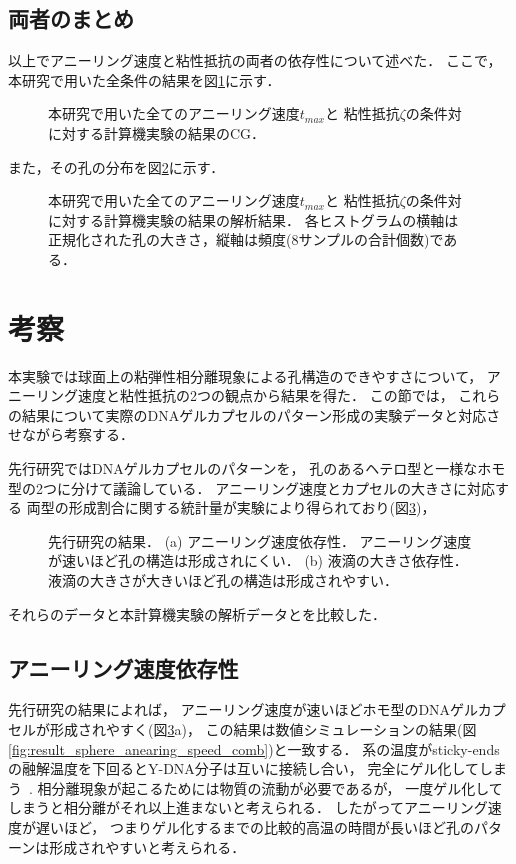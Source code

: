 \subsection{両者のまとめ}
以上でアニーリング速度と粘性抵抗の両者の依存性について述べた．
ここで，本研究で用いた全条件の結果を図\ref{fig:result_sphere_all}に示す．
\begin{figure}
    \centering
    
    \caption{
        本研究で用いた全てのアニーリング速度$t_{max}$と
        粘性抵抗$\zeta$の条件対に対する計算機実験の結果のCG．
    }
\label{fig:result_sphere_all}
\end{figure}
また，その孔の分布を図\ref{fig:result_sphere_all_hist}に示す．
\begin{figure}
    \centering
    
    \caption{
        本研究で用いた全てのアニーリング速度$t_{max}$と
        粘性抵抗$\zeta$の条件対に対する計算機実験の結果の解析結果．
        各ヒストグラムの横軸は正規化された孔の大きさ，縦軸は頻度(8サンプルの合計個数)である．
    }
    \label{fig:result_sphere_all_hist}
\end{figure}


\section{考察}
本実験では球面上の粘弾性相分離現象による孔構造のできやすさについて，
アニーリング速度と粘性抵抗の2つの観点から結果を得た．
この節では，
これらの結果について実際のDNAゲルカプセルのパターン形成の実験データと対応させながら考察する．

先行研究ではDNAゲルカプセルのパターンを，
孔のあるヘテロ型と一様なホモ型の2つに分けて議論している．
アニーリング速度とカプセルの大きさに対応する
両型の形成割合に関する統計量が実験により得られており(図\ref{fig:result_moritasan})，
\begin{figure}
    \centering
    
    \caption{
        先行研究の結果\cite{moritasan}．
        (a) アニーリング速度依存性．
            アニーリング速度が速いほど孔の構造は形成されにくい．
        (b) 液滴の大きさ依存性．
            液滴の大きさが大きいほど孔の構造は形成されやすい．
    }
    \label{fig:result_moritasan}
\end{figure}
それらのデータと本計算機実験の解析データとを比較した．


\subsection{アニーリング速度依存性}
先行研究の結果によれば，
アニーリング速度が速いほどホモ型のDNAゲルカプセルが形成されやすく(図\ref{fig:result_moritasan}a)，
この結果は数値シミュレーションの結果(図\ref{fig:result_sphere_anearing_speed_comb})と一致する．
系の温度がsticky-endsの融解温度を下回るとY-DNA分子は互いに接続し合い，
完全にゲル化してしまう~\cite{sato2019sequence}.
相分離現象が起こるためには物質の流動が必要であるが，
一度ゲル化してしまうと相分離がそれ以上進まないと考えられる．
したがってアニーリング速度が遅いほど，
つまりゲル化するまでの比較的高温の時間が長いほど孔のパターンは形成されやすいと考えられる．


